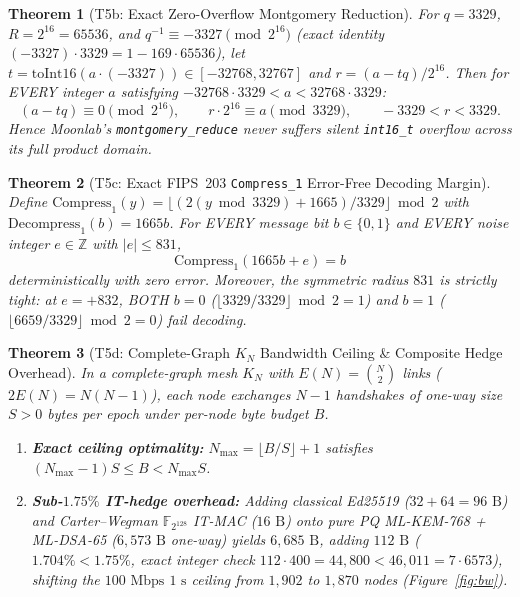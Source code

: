\documentclass[11pt,reqno]{amsart}
\newtheorem{theorem}{Theorem}[section]
\theoremstyle{definition}
\newcommand{\F}{\mathbb{F}}
\newcommand{\Z}{\mathbb{Z}}
\newcommand{\code}[1]{\texttt{\small #1}}
\begin{document}
\begin{theorem}[T5b: Exact Zero-Overflow Montgomery Reduction]
\label{thm:t5b}
For $q = 3329$, $R = 2^{16} = 65536$, and $q^{-1} \equiv -3327 \pmod{2^{16}}$ (exact identity $(-3327)\cdot 3329 = 1 - 169 \cdot 65536$), let $t = \mathrm{toInt16}(a \cdot (-3327)) \in [-32768, 32767]$ and $r = (a - tq)/2^{16}$. Then for EVERY integer $a$ satisfying $-32768 \cdot 3329 < a < 32768 \cdot 3329$:
\[
  (a - tq) \equiv 0 \pmod{2^{16}}, \qquad r \cdot 2^{16} \equiv a \pmod{3329}, \qquad -3329 < r < 3329.
\]
Hence Moonlab's \code{montgomery\_reduce} never suffers silent \code{int16\_t} overflow across its full product domain.
\end{theorem}

\begin{theorem}[T5c: Exact FIPS~203 \code{Compress\_1} Error-Free Decoding Margin]
\label{thm:t5c}
Define $\mathrm{Compress}_1(y) = \lfloor (2(y \bmod 3329) + 1665)/3329 \rfloor \bmod 2$ with $\mathrm{Decompress}_1(b) = 1665 b$.
For EVERY message bit $b \in \{0, 1\}$ and EVERY noise integer $e \in \Z$ with $|e| \le 831$,
\[
  \mathrm{Compress}_1(1665 b + e) = b
\]
deterministically with zero error. Moreover, the symmetric radius $831$ is strictly tight: at $e = +832$, BOTH $b = 0$ ($\lfloor 3329/3329 \rfloor \bmod 2 = 1$) and $b = 1$ ($\lfloor 6659/3329 \rfloor \bmod 2 = 0$) fail decoding.
\end{theorem}

\begin{theorem}[T5d: Complete-Graph $K_N$ Bandwidth Ceiling \& Composite Hedge Overhead]
\label{thm:t5d}
In a complete-graph mesh $K_N$ with $E(N) = \binom{N}{2}$ links ($2 E(N) = N(N-1)$), each node exchanges $N - 1$ handshakes of one-way size $S > 0$ bytes per epoch under per-node byte budget $B$.
\begin{enumerate}[leftmargin=1.8em]
  \item \textbf{Exact ceiling optimality:} $N_{\max} = \lfloor B / S \rfloor + 1$ satisfies $(N_{\max} - 1) S \le B < N_{\max} S$.
  \item \textbf{Sub-$1.75\%$ IT-hedge overhead:} Adding classical Ed25519 ($32 + 64 = 96\text{ B}$) and Carter--Wegman $\F_{2^{128}}$ IT-MAC ($16\text{ B}$) onto pure PQ ML-KEM-768 + ML-DSA-65 ($6{,}573\text{ B}$ one-way) yields $6{,}685\text{ B}$, adding $112\text{ B}$ ($1.704\% < 1.75\%$, exact integer check $112 \cdot 400 = 44{,}800 < 46{,}011 = 7 \cdot 6573$), shifting the $100\text{ Mbps}$ $1\text{ s}$ ceiling from $1{,}902$ to $1{,}870$ nodes (Figure~\ref{fig:bw}).
\end{enumerate}
\end{theorem}
\end{document}
